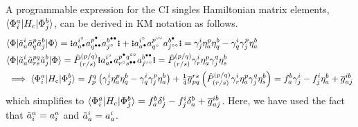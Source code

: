 \documentclass[11pt]{article}
\numberwithin{equation}{section}
\begin{document}
\begin{ex}
A programmable expression for the CI singles Hamiltonian matrix elements, $\langle\Phi _i^a|H_c|\Phi _j^b\rangle$,  can be derived in KM notation as follows.
\begin{align*}
&
  \ip{\F|\tl{a}_a^i\tl{a}_q^p\tl{a}_j^b|\F}
=
  \gno{
    a_{a^\ptcl}^{i^\hole}
    a_{q^{\ptcl\ptcl}}^{p^\ptcl}
    a_{j^\hole}^{b^{\ptcl\ptcl}}
  }
+
  \gno{
    a_{a^\ptcl}^{i^{\hole}}
    a_{q^{\hole}}^{p^{\hole\hole}}
    a_{j^{\hole\hole}}^{b^{\ptcl}}
  }
=
  \g^i_j\h_a^p\h_q^b
-
  \g_q^i\g_j^p\h_a^b
\\
&
  \ip{\F|\tl{a}_a^i\tl{a}^{pq}_{rs}\tl{a}_j^b|\F}
=
  \op{P}^{(p/q)}_{(r/s)}
  \gno{
    a^{i^\hole}_{a^\ptcl}
    a^{p^\ptcl q^{\hole\hole}}_{r^\hole s^{\ptcl\ptcl}}
    a^{b^{\ptcl\ptcl}}_{j^{\hole\hole}}
  }
=
  \op{P}^{(p/q)}_{(r/s)}
  \g^i_r\h^p_a\g^q_j\h^b_s
\\
&
\implies
  \ip{\F_i^a|H_\mr{c}|\F_j^b}
=
  f_p^q\pr{
    \g^i_j\h_a^p\h_q^b
  -
    \g_q^i\g_j^p\h_a^b
  }
+
  \tfr{1}{4}
  \ol{g}_{pq}^{rs}\pr{
    \op{P}^{(p/q)}_{(r/s)}
    \g^i_r\h^p_a\g^q_j\h^b_s
  }
=
  f_a^b\g_j^i
-
  f_j^i\h_a^b
+
  \ol{g}^{ib}_{aj}
\end{align*}
which simplifies to
$\langle\Phi _i^a|H_{\mathrm{c}}|\Phi _j^b\rangle=f_a^b\delta _j^i-f_j^i\delta _a^b+\overline{g}^{ib}_{aj}$.
Here, we have used the fact that $\tilde{a}_i^a=a_i^a$ and $\tilde{a}_a^i=a_a^i$.
\end{ex}
\end{document}
